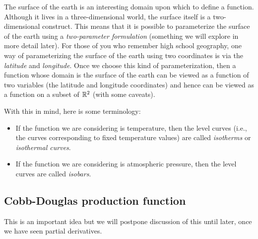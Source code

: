 \documentclass[10pt]{amsart}
\begin{document}
The surface of the earth is an interesting domain upon which to define
a function. Although it lives in a three-dimensional world, the
surface itself is a two-dimensional construct. This means that it is
possible to parameterize the surface of the earth using a {\em
two-parameter formulation} (something we will explore in more detail
later). For those of you who remember high school geography, one way
of parameterizing the surface of the earth using two coordinates is
via the {\em latitude} and {\em longitude}. Once we choose this kind
of parameterization, then a function whose domain is the surface of
the earth can be viewed as a function of two variables (the latitude
and longitude coordinates) and hence can be viewed as a function on a
subset of $\mathbb{R}^2$ (with some caveats).

With this in mind, here is some terminology:

\begin{itemize}
\item If the function we are considering is temperature, then the
  level curves (i.e., the curves corresponding to fixed temperature
  values) are called {\em isotherms} or {\em isothermal curves}.
\item If the function we are considering is atmospheric pressure, then
  the level curves are called {\em isobars}.
\end{itemize}

\subsection{Cobb-Douglas production function}

This is an important idea but we will postpone discussion of this
until later, once we have seen partial derivatives.
\end{document}
